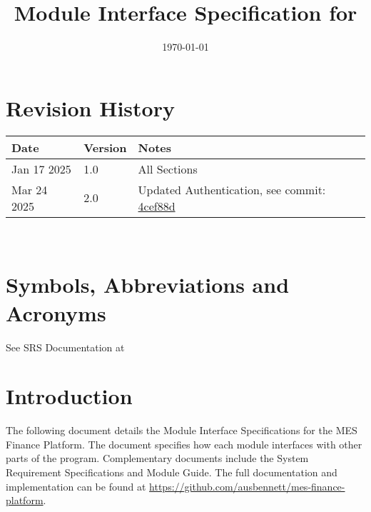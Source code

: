 \documentclass[12pt, titlepage]{article}
\begin{document}
\title{Module Interface Specification for \progname{}}

\author{\authname}

\date{\today}

\maketitle


\section{Revision History}

\begin{tabularx}{\textwidth}{p{3cm}p{2cm}X}
\toprule {\bf Date} & {\bf Version} & {\bf Notes}\\
\midrule
Jan 17 2025 & 1.0 & All Sections\\
Mar 24 2025 & 2.0 & Updated Authentication, see commit: \href{https://github.com/ausbennett/mes-finance-platform/commit/4cef88de4d7c2a664fa8e2395804251c0a6baeb4}{4cef88d}\\
\bottomrule
\end{tabularx}

~\newpage

\section{Symbols, Abbreviations and Acronyms}

See SRS Documentation at 


\newpage

\tableofcontents

\newpage


\section{Introduction}

The following document details the Module Interface Specifications for
the MES Finance Platform. The document specifies how each module interfaces with other parts of the program. Complementary documents include the System Requirement Specifications and Module Guide.  The full documentation and implementation can be found at \url{https://github.com/ausbennett/mes-finance-platform}.
\end{document}
